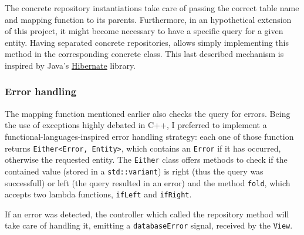 \documentclass[10pt]{article}
\begin{document}
The concrete repository instantiations take care of passing the correct table
name and mapping function to its parents. Furthermore, in an hypothetical
extension of this project, it might become necessary to have a specific query
for a given entity. Having separated concrete repositories, allows simply
implementing this method in the corresponding concrete class. This last
described mechanism is inspired by Java's
\href{https://hibernate.org/}{Hibernate} library.

\subsubsection{Error handling}
The mapping function mentioned earlier also checks the query for errors. Being
the use of exceptions highly debated in C++, I preferred to implement a
functional-languages-inspired error handling strategy: each one of those
function returns \texttt{Either<Error, Entity>}, which contains
an \texttt{Error} if it has occurred, otherwise the requested entity. The
\texttt{Either} class offers methods to check if the contained value (stored in
a \texttt{std::variant}) is right (thus the query was successfull) or left (the
query resulted in an error) and the method \texttt{fold}, which accepts two
lambda functions, \texttt{ifLeft} and \texttt{ifRight}.

If an error was detected, the controller which called the repository method
will take care of handling it, emitting a \texttt{databaseError} signal, 
received by the \texttt{View}.
\end{document}
